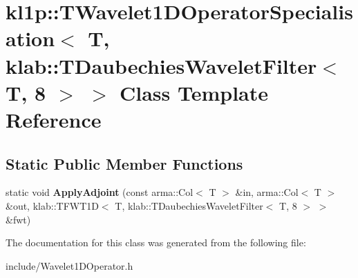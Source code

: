 \hypertarget{classkl1p_1_1TWavelet1DOperatorSpecialisation_3_01T_00_01klab_1_1TDaubechiesWaveletFilter_3_01T_00_018_01_4_01_4}{}\section{kl1p\+:\+:T\+Wavelet1\+D\+Operator\+Specialisation$<$ T, klab\+:\+:T\+Daubechies\+Wavelet\+Filter$<$ T, 8 $>$ $>$ Class Template Reference}
\label{classkl1p_1_1TWavelet1DOperatorSpecialisation_3_01T_00_01klab_1_1TDaubechiesWaveletFilter_3_01T_00_018_01_4_01_4}
\subsection*{Static Public Member Functions}
\begin{DoxyCompactItemize}
\item 
static void {\bfseries Apply\+Adjoint} (const arma\+::\+Col$<$ T $>$ \&in, arma\+::\+Col$<$ T $>$ \&out, klab\+::\+T\+F\+W\+T1D$<$ T, klab\+::\+T\+Daubechies\+Wavelet\+Filter$<$ T, 8 $>$ $>$ \&fwt)\hypertarget{classkl1p_1_1TWavelet1DOperatorSpecialisation_3_01T_00_01klab_1_1TDaubechiesWaveletFilter_3_01T_00_018_01_4_01_4_ac4f23aa8496f08799aeeb1d516bcebae}{}\label{classkl1p_1_1TWavelet1DOperatorSpecialisation_3_01T_00_01klab_1_1TDaubechiesWaveletFilter_3_01T_00_018_01_4_01_4_ac4f23aa8496f08799aeeb1d516bcebae}

\end{DoxyCompactItemize}


The documentation for this class was generated from the following file\+:\begin{DoxyCompactItemize}
\item 
include/Wavelet1\+D\+Operator.\+h\end{DoxyCompactItemize}
